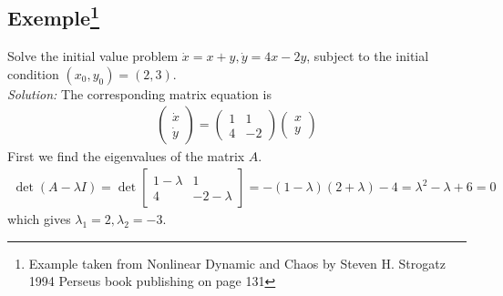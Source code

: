 \subsection*{Exemple\footnote{Example taken from Nonlinear Dynamic and Chaos by Steven H. Strogatz 1994 Perseus book publishing on page 131}}
Solve the initial value problem $\dot x=x+y, \dot y=4x-2y$, subject to the initial condition $(x_0,y_0)=(2, 3)$.
\\

\emph{Solution:}
The corresponding matrix equation is
\begin{eqnarray*}
	\begin{pmatrix}
		\dot x
		\\
		\dot y
	\end{pmatrix}
	=
	\begin{pmatrix}
		1 & 1
		\\
		4 & -2
	\end{pmatrix}
	\begin{pmatrix}
		x 
		\\
		y
	\end{pmatrix}
\end{eqnarray*}
First we find the eigenvalues of the matrix $A$. 
\begin{eqnarray*}
	\det(A-\lambda I)=
	\det\begin{bmatrix}
		1-\lambda & 1
		\\
		4 & -2-\lambda
	\end{bmatrix}
	=
	-(1-\lambda)(2+\lambda)-4=
	\lambda^2-\lambda+6
	=0
\end{eqnarray*}
which gives $\lambda_1=2, \lambda_2=-3$.
\\

